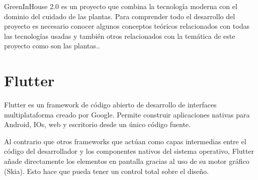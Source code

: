 
GreenInHouse 2.0 es un proyecto que combina la tecnología moderna con el dominio del cuidado de las plantas. Para comprender todo el desarrollo del proyecto es necesario conocer algunos conceptos teóricos relacionados con todas las tecnologías usadas y también otros relacionados con la temática de este proyecto como son las plantas..


\section{Flutter}
Flutter es un framework de código abierto de desarrollo de interfaces multiplataforma creado por Google. Permite construir aplicaciones nativas para Android, IOs, web y escritorio desde un único código fuente. 

Al contrario que otros frameworks que actúan como capas intermedias entre el código del desarrollador y los componentes nativos del sistema operativo, Flutter añade directamente los elementos en pantalla gracias al uso de su motor gráfico (Skia). Esto hace que pueda tener un control total sobre el diseño.

